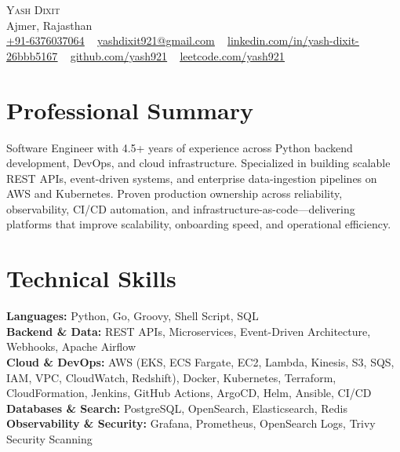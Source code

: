\documentclass[letterpaper,10pt]{article}
\begin{document}
\begin{center}
    {\Huge \scshape Yash Dixit} \\ \vspace{2pt}
    Ajmer, Rajasthan \\ \vspace{2pt}
    \small
    \href{tel:+916376037064}{\underline{+91-6376037064}} ~
    \href{mailto:yashdixit921@gmail.com}{\underline{yashdixit921@gmail.com}} ~
    \href{https://linkedin.com/in/yash-dixit-26bbb5167/}{\underline{linkedin.com/in/yash-dixit-26bbb5167}} ~
    \href{https://github.com/yash921}{\underline{github.com/yash921}} ~
    \href{https://leetcode.com/yash921/}{\underline{leetcode.com/yash921}}
\end{center}

\section{Professional Summary}
Software Engineer with 4.5+ years of experience across Python backend development, DevOps, and cloud infrastructure. Specialized in building scalable REST APIs, event-driven systems, and enterprise data-ingestion pipelines on AWS and Kubernetes. Proven production ownership across reliability, observability, CI/CD automation, and infrastructure-as-code—delivering platforms that improve scalability, onboarding speed, and operational efficiency.

\section{Technical Skills}
\begin{itemize}[leftmargin=0.15in, label={}, topsep=2pt, itemsep=2pt]
\small{\item{
\textbf{Languages:} Python, Go, Groovy, Shell Script, SQL \\
\textbf{Backend \& Data:} REST APIs, Microservices, Event-Driven Architecture, Webhooks, Apache Airflow \\
\textbf{Cloud \& DevOps:} AWS (EKS, ECS Fargate, EC2, Lambda, Kinesis, S3, SQS, IAM, VPC, CloudWatch, Redshift), Docker, Kubernetes, Terraform, CloudFormation, Jenkins, GitHub Actions, ArgoCD, Helm, Ansible, CI/CD \\
\textbf{Databases \& Search:} PostgreSQL, OpenSearch, Elasticsearch, Redis \\
\textbf{Observability \& Security:} Grafana, Prometheus, OpenSearch Logs, Trivy Security Scanning
}}
\end{itemize}
\end{document}
